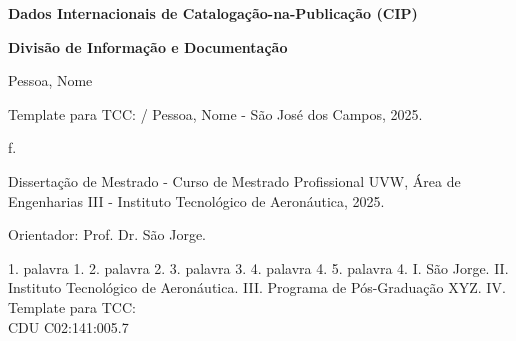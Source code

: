 \documentclass[
  12pt,
  oneside,
  a4paper,
  english,
  brazil]{abntex2}
\begin{document}
\newpage{}

\textbf{Dados Internacionais de Catalogação-na-Publicação (CIP)}

\textbf{Divisão de Informação e Documentação}

\vspace{-3mm}

\begin{framed}

\begin{center}
\begin{minipage}[c]{13.5cm}

\footnotesize

\vspace{-5mm}


Pessoa, Nome



\hspace{0.5cm} Template para TCC: / Pessoa, Nome - São José dos Campos, 2025.

\hspace{0.5cm} \pageref{LastPage} f.

\vspace{5mm}

\hspace{0.5cm} Dissertação de Mestrado - Curso de Mestrado Profissional UVW, Área de Engenharias III - Instituto Tecnológico de Aeronáutica, 2025.

\vspace{5mm}

\hspace{0.5cm} Orientador: Prof. Dr. São Jorge.

\hspace{0.5cm}
    1. palavra 1.
    2. palavra 2.
    3. palavra 3.
    4. palavra 4.
    5. palavra 4.
    I. São Jorge.
    II. Instituto Tecnológico de Aeronáutica.
    III. Programa de Pós-Graduação XYZ.
    IV. Template para TCC:\\            

\hspace{9.75cm} CDU C02:141:005.7\\

\vspace{-8mm}

\normalsize

\end{minipage}
\end{center}

\end{framed}

\vfill
\end{document}
